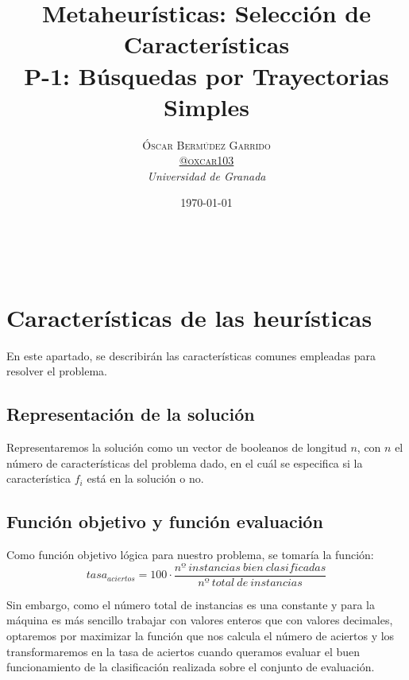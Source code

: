 \documentclass[a4paper, 11pt]{article}
\title{\textbf{Metaheurísticas: Selección de Características}\\ %
P-1: Búsquedas por Trayectorias Simples} %
\author{\textsc{Óscar Bermúdez Garrido\\
\href{http://www.github.com/oxcar103}{@oxcar103}} %
\\{\textit{Universidad de Granada}}} %
\date{\today} %
\makeatletter
\renewcommand{\maketitle}{
  \begin{flushright} %
  {\LARGE\@title} %
  
  \vspace{50pt} %
  
  {\large\@author} %
  \\\@date %
  \vspace{40pt} %
  \end{flushright}
}
\makeatother
\begin{document}
\maketitle %

\renewcommand{\abstractname}{Resumen} %



{\parskip=2pt
  \tableofcontents
}
\pagebreak

	

	\section{Características de las heurísticas}
		En este apartado, se describirán las características comunes empleadas para resolver
		el problema.
		
		\subsection{Representación de la solución}
			Representaremos la solución como un vector de booleanos de longitud $n$, con $n$
			el número de características del problema dado, en el cuál se especifica si la
			característica $f_i$ está en la solución o no.
		
		\subsection{Función objetivo y función evaluación}
			Como función objetivo lógica para nuestro problema, se tomaría la función:
			$$tasa_{aciertos} = 100 \cdot \frac{nº\ instancias\ bien\ clasificadas}{nº\ total\ de\ instancias}$$
			
			Sin embargo, como el número total de instancias es una constante y para la máquina
			es más sencillo trabajar con valores enteros que con valores decimales, optaremos
			por maximizar la función que nos calcula el número de aciertos y los transformaremos
			en la tasa de aciertos cuando queramos evaluar el buen funcionamiento de la
			clasificación realizada sobre el conjunto de evaluación.
			
\end{document}

